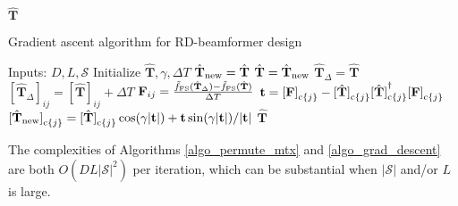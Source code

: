 \documentclass[journal,comsoc]{IEEEtran}
\begin{document}
\begin{appendices}
\begin{algorithm}
\begin{algorithmic}[1]
\RETURN $\hat{\mathbf{T}}$
\end{algorithmic}
\end{algorithm}
%
%
\begin{algorithm}
\caption{Gradient ascent algorithm for RD-beamformer design}\label{algo_grad_descent}
\begin{algorithmic}[1]
\STATE Inputs: $D, L, \mathcal{S}$
\STATE Initialize $\hat{\mathbf{T}}, \gamma, \Delta T$
\STATE $\hat{\mathbf{T}}_{\rm new} = \hat{\mathbf{T}}$
%
\REPEAT
\STATE $\hat{\mathbf{T}} = \hat{\mathbf{T}}_{\rm new}$
\STATE $\hat{\mathbf{T}}_{\Delta} = \hat{\mathbf{T}}$
\STATE ${[\hat{\mathbf{T}}_{\Delta}]}_{ij} = {[\hat{\mathbf{T}}]}_{ij} + \Delta T$
\STATE $\mathbf{F}_{ij} = \frac{\tilde{f}_{\rm FS}(\hat{\mathbf{T}}_{\Delta}) - \tilde{f}_{\rm FS}(\hat{\mathbf{T}})}{\Delta T}$
\ENDFOR
\ENDFOR
%
\STATE $\mathbf{t} = {[\mathbf{F}]}_{{\rm c}\{j\}} - {[\hat{\mathbf{T}}]}_{{\rm c}\{j\}} {[\hat{\mathbf{T}}]}_{{\rm c}\{j\}}^{\dag} {[\mathbf{F}]}_{{\rm c}\{j\}} $
\STATE ${[\hat{\mathbf{T}}_{\rm new}]}_{{\rm c}\{j\}} = {[\hat{\mathbf{T}}]}_{{\rm c}\{j\}} \cos(\gamma|\mathbf{t}|) + \mathbf{t}\sin(\gamma|\mathbf{t}|)/|\mathbf{t}|$
\ENDFOR
%
%
%
\RETURN $\hat{\mathbf{T}}$
\end{algorithmic}
\end{algorithm}
%
The complexities of Algorithms \ref{algo_permute_mtx} and \ref{algo_grad_descent} are both $O(D L {|\mathcal{S}|}^2)$ per iteration, which can be substantial when $|\mathcal{S}|$ and/or $L$ is large. 

%

\end{appendices}
\end{document}
